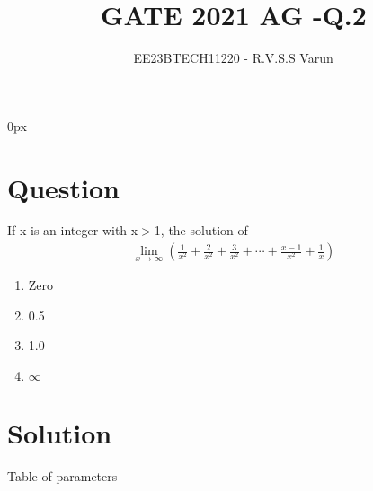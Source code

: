 \documentclass[beamer]{IEEEtran}
\theoremstyle{remark}
\begin{document}
\parindent 0px


\title{GATE 2021 AG -Q.2}
\author{EE23BTECH11220 - R.V.S.S Varun$^{}$%
}
\maketitle
\newpage
\bigskip

\renewcommand{\thefigure}{\theenumi}
\renewcommand{\thetable}{\theenumi}
\section*{Question}
If x is an integer with  x$>$1, the solution of 
\begin{align*}
\lim_{x\to\infty}\left(\frac{1}{x^2}+\frac{2}{x^2}+\frac{3}{x^2}+\cdots+\frac{x-1}{x^2}+\frac{1}{x}\right)
\end{align*}
\begin{enumerate}[label=\alph*)]
\item Zero 
\item 0.5 
\item 1.0 
\item $\infty$  \hfill{}
\end{enumerate}
\section*{Solution}

\begin{table}[h]
    \centering

 \caption{Table of parameters}
    \label{tab:AG.2.1}
\end{table}
\end{document}
